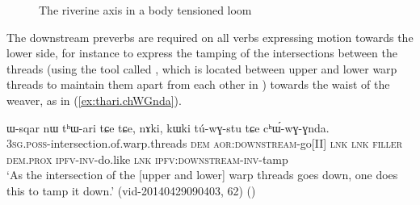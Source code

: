 \begin{figure} 
\caption{The riverine axis in a body tensioned loom}
\label{fig:loom1}
\end{figure}

The downstream preverbs are required on all verbs expressing motion towards the lower side, for instance to express the tamping of the intersections between the threads (using the tool called , which is located between upper and lower warp threads to maintain them apart from each other in ) towards the waist of the weaver, as in (\ref{ex:thari.chWGnda}).

 \begin{exe}
\ex \label{ex:thari.chWGnda}
\gll ɯ-sqar nɯ tʰɯ-ari tɕe tɕe, nɤki, kɯki tú-wɣ-stu tɕe cʰɯ́-wɣ-ɣnda. \\
\textsc{3sg}.\textsc{poss}-intersection.of.warp.threads \textsc{dem} \textsc{aor}:\textsc{downstream}-go[II] \textsc{lnk} \textsc{lnk} \textsc{filler} \textsc{dem}.\textsc{prox} \textsc{ipfv}-\textsc{inv}-do.like \textsc{lnk} \textsc{ipfv}:\textsc{downstream}-\textsc{inv}-tamp \\
\glt `As the intersection of the [upper and lower] warp threads goes down, one does this to tamp it down.' (vid-20140429090403, 62) ()
\end{exe} 

